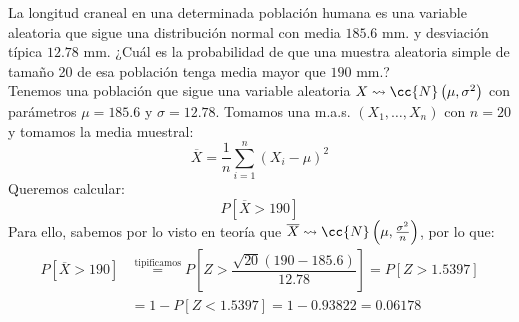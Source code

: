 \begin{ejercicio}
    La longitud craneal en una determinada población humana es una variable aleatoria que sigue una distribución normal con media $185.6$ mm. y desviación típica $12.78$ mm. ¿Cuál es la probabilidad de que una muestra aleatoria simple de tamaño 20 de esa población tenga media mayor que $190$ mm.?\\

    \noindent
    Tenemos una población que sigue una variable aleatoria $X\rightsquigarrow \cc{N}\left(\mu, \sigma^2\right)$ con parámetros $\mu = 185.6$ y $\sigma=12.78$. Tomamos una m.a.s. $(X_1, \ldots, X_n)$ con $n=20$ y tomamos la media muestral:
    \begin{equation*}
        \overline{X} = \dfrac{1}{n}\sum_{i=1}^{n}{(X_i - \mu)}^{2}
    \end{equation*}
    Queremos calcular:
    \begin{equation*}
        P\left[\overline{X}>190\right]
    \end{equation*}
    Para ello, sabemos por lo visto en teoría que $\overline{X}\rightsquigarrow\cc{N}\left(\mu, \frac{\sigma^2}{n}\right)$, por lo que:
    \begin{align*}
        P\left[\overline{X}>190\right] &\stackrel{\text{tipificamos}}{=} P\left[Z > \dfrac{\sqrt{20}(190-185.6)}{12.78}\right] = P[Z > 1.5397] \\ 
                                                                     &= 1-P[Z<1.5397] = 1-0.93822 = 0.06178
    \end{align*}
\end{ejercicio}

